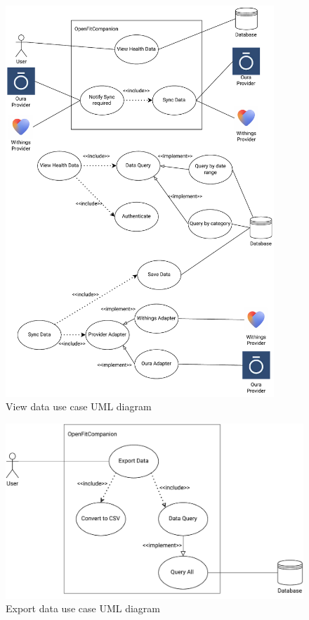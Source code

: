 \begin{figure}
    
    \centering
    \includegraphics[width=0.9\textwidth,keepaspectratio]{../images/viewFunc.pdf}
    \caption{View data use case UML diagram}
    \label{fig:2}
\end{figure}
\begin{figure}
    
    \centering
    \includegraphics[width=\textwidth,keepaspectratio]{../images/exportDataFunc.pdf}
    \caption{Export data use case UML diagram}
    \label{fig:3}
    
\end{figure}
